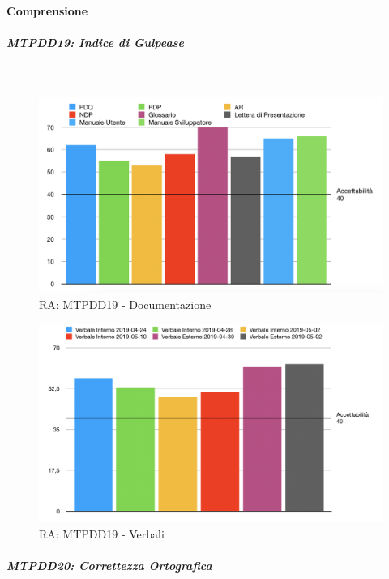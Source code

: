 \paragraph{Comprensione}

\subparagraph{MTPDD19: Indice di Gulpease} \-\\

\begin{figure}[H]
	\begin{center}
		\includegraphics[scale=0.5]{./images/grafici_RA/MTPDD19.png} 
		\caption{RA: MTPDD19 - Documentazione}
	\end{center}
\end{figure}

\begin{figure}[H]
	\begin{center}
		\includegraphics[scale=0.5]{./images/grafici_RA/MTPDD19-Verbali.png} 
		\caption{RA: MTPDD19 - Verbali}
	\end{center}
\end{figure}

\subparagraph{MTPDD20: Correttezza Ortografica} \-\\

